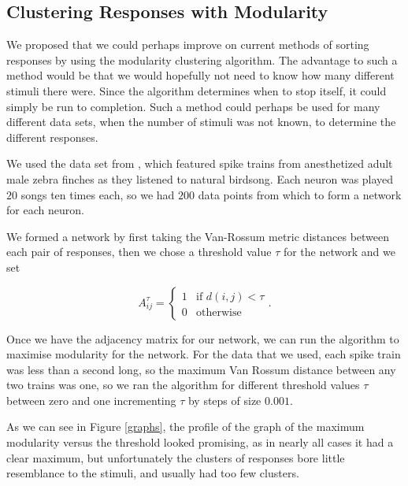 \subsection{Clustering Responses with Modularity}


We proposed that we could perhaps improve on current methods of sorting 
responses by using the modularity clustering algorithm.  The advantage to such 
a method would be that we would hopefully not need to know how many different 
stimuli there were. Since the algorithm determines when to stop itself, it 
could simply be run to completion.  Such a method could perhaps be used for 
many different data sets, when the number of stimuli was not known, to 
determine the different responses.

We used the data set from \cite{NarayanEtAl2006b}, which featured spike trains 
from anesthetized adult male zebra finches as they listened to natural 
birdsong.  Each neuron was played $20$ songs ten times each, so we had $200$ 
data points from which to form a network for each neuron.

We formed a network by first taking the Van-Rossum metric distances between 
each pair of responses, then we chose a threshold value $\tau$ for the network 
and we set

\begin{equation}
A^{\tau}_{ij} = \left\{ \begin{array}{ll} 1 & \mbox{if }d(i,j)<\tau \\
0 & \mbox{otherwise}
\end{array}\right. .
\end{equation}

Once we have the adjacency matrix for our network, we can run the algorithm to 
maximise modularity for the network.  For the data that we used, 
each spike train was less than a second long, so the maximum Van Rossum 
distance between any two trains was one, so we ran the algorithm for different 
threshold values $\tau$ between zero and one incrementing $\tau$ by steps of 
size $0.001$.

As we can see in Figure \ref{graphs}, the profile of the graph of the maximum 
modularity versus the threshold looked promising, as in nearly all cases it had 
a clear maximum, but unfortunately the clusters of responses bore little 
resemblance to the stimuli, and usually had too few clusters.


